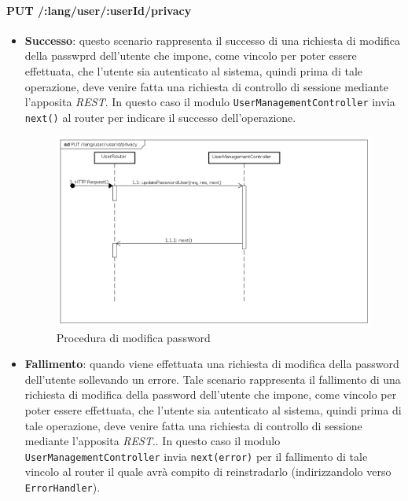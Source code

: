 \paragraph{PUT /:lang/user/:userId/privacy}
\begin{itemize}
\item \textbf{Successo}: questo scenario rappresenta il successo di una richiesta di modifica della passwprd dell'utente che impone, come vincolo per poter essere effettuata, che l'utente sia autenticato al sistema, quindi prima di tale operazione, deve venire fatta una richiesta di controllo di sessione mediante l'apposita \textit{REST}.  
In questo caso il modulo \texttt{UserManagementController} invia \texttt{next()} al router per indicare il successo dell'operazione.

\label{Procedura di modifica password}
\begin{figure}[ht]
	\centering
	\includegraphics[scale=0.40]{UML/DiagrammiDiSequenza/Back-end/PUT_LangUserUserIdPrivacySuccess.png}
	\caption{Procedura di modifica password}
\end{figure}
\FloatBarrier
\item \textbf{Fallimento}: quando viene effettuata una richiesta di modifica della password dell'utente sollevando un errore. Tale scenario rappresenta il fallimento di una richiesta di modifica della password dell'utente che impone, come vincolo per poter essere effettuata, che l'utente sia autenticato al sistema, quindi prima di tale operazione, deve venire fatta una richiesta di controllo di sessione mediante l'apposita \textit{REST}.. In questo caso il modulo \texttt{UserManagementController} invia \texttt{next(error)} per il fallimento di tale vincolo al router il quale avrà compito di reinstradarlo (indirizzandolo verso \texttt{ErrorHandler}).




\end{itemize}
